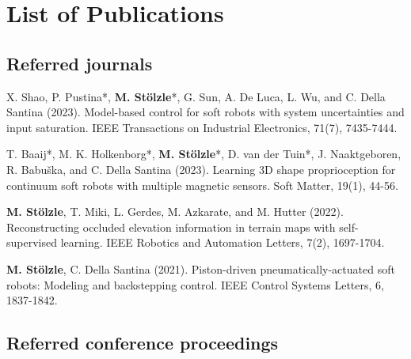 \chapter*{List of Publications}
\label{publications}

\section*{Referred journals}

\begin{enumerate}{
  \item X. Shao, P. Pustina*, \textbf{M. Stölzle}*, G. Sun, A. De Luca, L. Wu, and C. Della Santina (2023). Model-based control for soft robots with system uncertainties and input saturation. IEEE Transactions on Industrial Electronics, 71(7), 7435-7444.
  \item[\faFileTextO \, \stepcounter{enumi}\arabic{enumi}.] T. Baaij*, M. K. Holkenborg*, \textbf{M. Stölzle}*, D. van der Tuin*, J. Naaktgeboren, R. Babuška, and C. Della Santina (2023). Learning 3D shape proprioception for continuum soft robots with multiple magnetic sensors. Soft Matter, 19(1), 44-56.
  \item \textbf{M. Stölzle}, T. Miki, L. Gerdes, M. Azkarate, and M. Hutter (2022). Reconstructing occluded elevation information in terrain maps with self-supervised learning. IEEE Robotics and Automation Letters, 7(2), 1697-1704.
  \item[\faFileTextO \, \stepcounter{enumi}\arabic{enumi}.] \textbf{M. Stölzle}, C. Della Santina (2021). Piston-driven pneumatically-actuated soft robots: Modeling and backstepping control. IEEE Control Systems Letters, 6, 1837-1842.
}\end{enumerate}


\section*{Referred conference proceedings}

